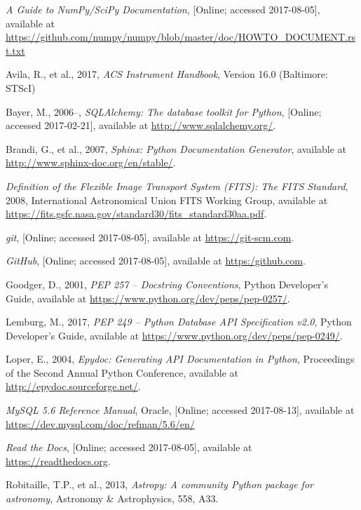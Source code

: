 \documentclass[10pt,journal,compsoc]{IEEEtran}
\begin{document}
\begin{thebibliography}{1}

\emph{A Guide to NumPy/SciPy Documentation}, [Online; accessed 2017-08-05], available at
\url{https://github.com/numpy/numpy/blob/master/doc/HOWTO_DOCUMENT.rst.txt}

Avila, R., et al., 2017, \emph{ACS Instrument Handbook}, Version 16.0 (Baltimore: STScI)

Bayer, M., 2006–, \emph{SQLAlchemy: The database toolkit for Python}, [Online; accessed 2017-02-21],
available at \url{http://www.sqlalchemy.org/}.

Brandi, G., et al., 2007, \emph{Sphinx: Python Documentation Generator}, available at
\url{http://www.sphinx-doc.org/en/stable/}.

\emph{Definition of the Flexible Image Transport System (FITS): The FITS Standard}, 2008,
International Astronomical Union FITS Working Group, available at
\url{https://fits.gsfc.nasa.gov/standard30/fits_standard30aa.pdf}.

\emph{git}, [Online; accessed 2017-08-05], available at \url{https://git-scm.com}.

\emph{GitHub}, [Online; accessed 2017-08-05], available at \url{https:/github.com}.

Goodger, D., 2001, \emph{PEP 257 -- Docstring Conventions}, Python Developer's Guide,
available at \url{https://www.python.org/dev/peps/pep-0257/}.

Lemburg, M., 2017, \emph{PEP 249 -- Python Database API Specification v2.0}, Python Developer's Guide,
available at \url{https://www.python.org/dev/peps/pep-0249/}.

Loper, E., 2004, \emph{Epydoc: Generating API Documentation in Python}, Proceedings of the
Second Annual Python Conference, available at \url{http://epydoc.sourceforge.net/}.

\emph{MySQL 5.6 Reference Manual}, Oracle, [Online; accessed 2017-08-13], available at
\url{https://dev.mysql.com/doc/refman/5.6/en/}

\emph{Read the Docs}, [Online; accessed 2017-08-05], available at \url{https://readthedocs.org}.

Robitaille, T.P., et al., 2013, \emph{Astropy: A community Python package for astronomy},
Astronomy \& Astrophysics, 558, A33.


\end{thebibliography}
\end{document}

